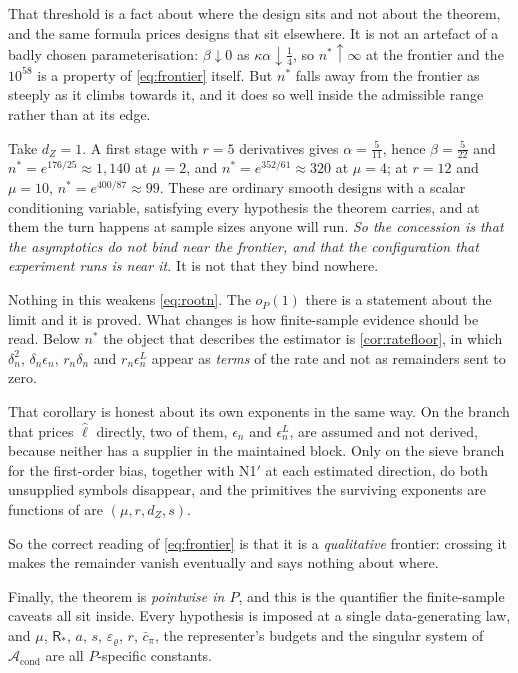 \documentclass[
  12pt]{article}
\newcommand{\1}[1]{\mathds{1}\left[#1\right]}
\theoremstyle{plain}
\theoremstyle{definition}
\theoremstyle{definition}
\theoremstyle{remark}
\begin{document}
That threshold is a fact about where the design sits and not about the
theorem, and the same formula prices designs that sit elsewhere. It is
not an artefact of a badly chosen parameterisation: \(\beta\downarrow0\)
as \(\kappa\alpha\downarrow\tfrac14\), so \(n^{\ast}\uparrow\infty\) at
the frontier and the \(10^{58}\) is a property of \eqref{eq:frontier}
itself. But \(n^{\ast}\) falls away from the frontier as steeply as it
climbs towards it, and it does so well inside the admissible range
rather than at its edge.

Take \(d_Z=1\). A first stage with \(r=5\) derivatives gives
\(\alpha=\tfrac5{11}\), hence \(\beta=\tfrac5{22}\) and
\(n^{\ast}=e^{176/25}\approx1{,}140\) at \(\mu=2\), and
\(n^{\ast}=e^{352/61}\approx320\) at \(\mu=4\); at \(r=12\) and
\(\mu=10\), \(n^{\ast}=e^{400/87}\approx99\). These are ordinary smooth
designs with a scalar conditioning variable, satisfying every hypothesis
the theorem carries, and at them the turn happens at sample sizes anyone
will run. \emph{So the concession is that the asymptotics do not bind
near the frontier, and that the configuration that experiment runs is
near it.} It is not that they bind nowhere.

Nothing in this weakens \eqref{eq:rootn}. The \(o_P(1)\) there is a
statement about the limit and it is proved. What changes is how
finite-sample evidence should be read. Below \(n^{\ast}\) the object
that describes the estimator is \cref{cor:ratefloor}, in which
\(\delta_n^{2}\), \(\delta_n\epsilon_n\), \(r_n\delta_n\) and
\(r_n\epsilon^{L}_n\) appear as \emph{terms} of the rate and not as
remainders sent to zero.

That corollary is honest about its own exponents in the same way. On the
branch that prices \(\hat\ell\) directly, two of them, \(\epsilon_n\)
and \(\epsilon^{L}_n\), are assumed and not derived, because neither has
a supplier in the maintained block. Only on the sieve branch for the
first-order bias, together with N1\('\) at each estimated direction, do
both unsupplied symbols disappear, and the primitives the surviving
exponents are functions of are \((\mu,r,d_Z,s)\).

So the correct reading of \eqref{eq:frontier} is that it is a
\emph{qualitative} frontier: crossing it makes the remainder vanish
eventually and says nothing about where.

Finally, the theorem is \emph{pointwise in \(P\)}, and this is the
quantifier the finite-sample caveats all sit inside. Every hypothesis is
imposed at a single data-generating law, and \(\mu\),
\(\mathsf R_\ast\), \(a\), \(s\), \(\varepsilon_\varrho\), \(r\),
\(\bar c_\pi\), the representer's budgets and the singular system of
\(\mathcal A_{\mathrm{cond}}\) are all \(P\)-specific constants.
\end{document}
